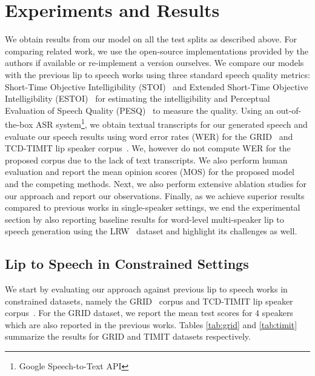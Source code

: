 \documentclass[10pt,twocolumn,letterpaper]{article}
\begin{document}
\section{Experiments and Results}
\label{section:experiments}
We obtain results from our \modelname model on all the test splits as described above. For comparing related work, we use the open-source implementations provided by the authors if available or re-implement a version ourselves. We compare our models with the previous lip to speech works using three standard speech quality metrics: Short-Time Objective Intelligibility (STOI)~\cite{stoi} and Extended Short-Time Objective Intelligibility (ESTOI)~\cite{estoi} for estimating the intelligibility and Perceptual Evaluation of Speech Quality (PESQ)~\cite{pesq} to measure the quality. Using an out-of-the-box ASR system\footnote{Google Speech-to-Text API}, we obtain textual transcripts for our generated speech and evaluate our speech results using word error rates (WER) for the GRID~\cite{cooke2006audio} and TCD-TIMIT lip speaker corpus~\cite{harte2015tcd}. We, however do not compute WER for the proposed \modelname corpus due to the lack of text transcripts. We also perform human evaluation and report the mean opinion scores (MOS) for the proposed \modelname model and the competing methods. Next, we also perform extensive ablation studies for our approach and report our observations. Finally, as we achieve superior results compared to previous works in single-speaker settings, we end the experimental section by also reporting baseline results for word-level multi-speaker lip to speech generation using the LRW~\cite{chung2016lip} dataset and highlight its challenges as well.

\subsection{Lip to Speech in Constrained Settings}
We start by evaluating our approach against previous lip to speech works in constrained datasets, namely the GRID~\cite{cooke2006audio} corpus and TCD-TIMIT lip speaker corpus~\cite{harte2015tcd}. For the GRID dataset, we report the mean test scores for $4$ speakers which are also reported in the previous works. Tables \ref{tab:grid} and \ref{tab:timit} summarize the results for GRID and TIMIT datasets respectively. 
\end{document}
